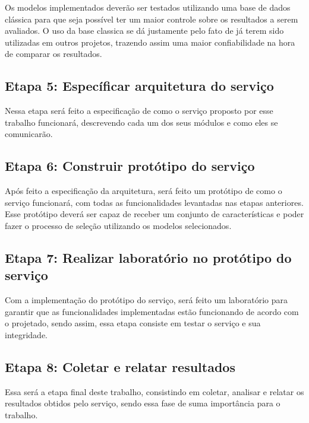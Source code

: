 Os modelos implementados deverão ser testados utilizando uma base de dados clássica para que seja possível ter um maior controle sobre os resultados a serem avaliados. O uso da base classica se dá justamente pelo fato de já terem sido utilizadas em outros projetos, trazendo assim uma maior confiabilidade na hora de comparar os resultados.

\subsection{Etapa 5: Específicar arquitetura do serviço}

Nessa etapa será feito a especificação de como o serviço proposto por esse trabalho funcionará, descrevendo cada um dos seus módulos e como eles se comunicarão.

\subsection{Etapa 6: Construir protótipo do serviço}

Após feito a especificação da arquitetura, será feito um protótipo de como o serviço funcionará, com todas as funcionalidades levantadas nas etapas anteriores. Esse protótipo deverá ser capaz de receber um conjunto de características e poder fazer o processo de seleção utilizando os modelos selecionados.

\subsection{Etapa 7: Realizar laboratório no protótipo do serviço}
Com a implementação do protótipo do serviço, será feito um laboratório para garantir que as funcionalidades implementadas estão funcionando de acordo com o projetado, sendo assim, essa etapa consiste em testar o serviço e sua integridade.

\subsection{Etapa 8: Coletar e relatar resultados}

Essa será a etapa final deste trabalho, consistindo em coletar, analisar e relatar os resultados obtidos pelo serviço, sendo essa fase de suma importância para o trabalho.
